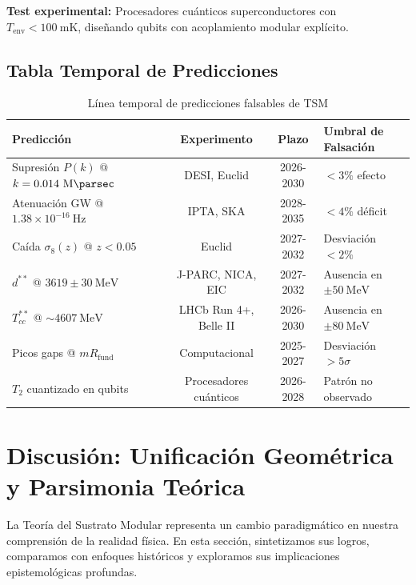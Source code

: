 \documentclass[11pt, a4paper]{article}
\theoremstyle{plain}
\theoremstyle{definition}
\newcommand{\Rfactor}{R_{\text{fund}}}
\begin{document}
\textbf{Test experimental:} Procesadores cuánticos superconductores con $T_{\text{env}} < 100\ \si{\milli\kelvin}$, diseñando qubits con acoplamiento modular explícito.

\subsection{Tabla Temporal de Predicciones}

\begin{table}[H]
\centering
\caption{Línea temporal de predicciones falsables de TSM}
\label{tab:timeline_predicciones}
\begin{tabular}{p{4.5cm}ccp{4cm}}
\toprule
\textbf{Predicción} & \textbf{Experimento} & \textbf{Plazo} & \textbf{Umbral de Falsación} \\
\midrule
Supresión $P(k)$ @ $k=0.014\ \si{\per\mega\parsec}$ & DESI, Euclid & 2026-2030 & $< 3\%$ efecto \\
Atenuación GW @ $1.38\times10^{-16}\ \si{\hertz}$ & IPTA, SKA & 2028-2035 & $< 4\%$ déficit \\
Caída $\sigma_8(z)$ @ $z<0.05$ & Euclid & 2027-2032 & Desviación $< 2\%$ \\
\addlinespace
$d^{**}$ @ $3619 \pm 30\ \si{\mega\electronvolt}$ & J-PARC, NICA, EIC & 2027-2032 & Ausencia en $\pm 50\ \si{\mega\electronvolt}$ \\
$T_{cc}^{**}$ @ $\sim 4607\ \si{\mega\electronvolt}$ & LHCb Run 4+, Belle II & 2026-2030 & Ausencia en $\pm 80\ \si{\mega\electronvolt}$ \\
\addlinespace
Picos gaps @ $m\Rfactor$ & Computacional & 2025-2027 & Desviación $> 5\sigma$ \\
$T_2$ cuantizado en qubits & Procesadores cuánticos & 2026-2028 & Patrón no observado \\
\bottomrule
\end{tabular}
\end{table}


\section{Discusión: Unificación Geométrica y Parsimonia Teórica}
\label{sec:discusion}

La Teoría del Sustrato Modular representa un cambio paradigmático en nuestra comprensión de la realidad física. En esta sección, sintetizamos sus logros, comparamos con enfoques históricos y exploramos sus implicaciones epistemológicas profundas.
\end{document}
